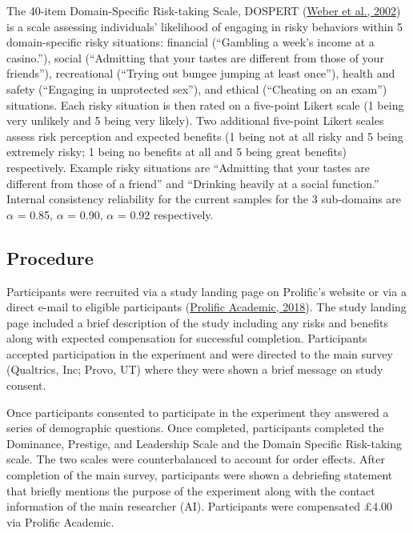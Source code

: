 \documentclass[
  donotrepeattitle,doc, 12pt, a4paper,floatsintext]{apa7}
\begin{document}
The 40-item Domain-Specific Risk-taking Scale, DOSPERT (\protect\hyperlink{ref-weber2002}{Weber et al., 2002}) is a scale assessing individuals' likelihood of engaging in risky behaviors within 5 domain-specific risky situations: financial (``Gambling a week's income at a casino.''), social (``Admitting that your tastes are different from those of your friends''), recreational (``Trying out bungee jumping at least once''), health and safety (``Engaging in unprotected sex''), and ethical (``Cheating on an exam'') situations. Each risky situation is then rated on a five-point Likert scale (1 being very unlikely and 5 being very likely). Two additional five-point Likert scales assess risk perception and expected benefits (1 being not at all risky and 5 being extremely risky; 1 being no benefits at all and 5 being great benefits) respectively. Example risky situations are ``Admitting that your tastes are different from those of a friend'' and ``Drinking heavily at a social function.'' Internal consistency reliability for the current samples for the 3 sub-domains are \(\alpha\) = 0.85, \(\alpha\) = 0.90, \(\alpha\) = 0.92 respectively.

\hypertarget{procedure}{%
\subsection{Procedure}\label{procedure}}

Participants were recruited via a study landing page on Prolific's website or via a direct e-mail to eligible participants (\protect\hyperlink{ref-prolificacademic2018}{Prolific Academic, 2018}). The study landing page included a brief description of the study including any risks and benefits along with expected compensation for successful completion. Participants accepted participation in the experiment and were directed to the main survey (Qualtrics, Inc; Provo, UT) where they were shown a brief message on study consent.

Once participants consented to participate in the experiment they answered a series of demographic questions. Once completed, participants completed the Dominance, Prestige, and Leadership Scale and the Domain Specific Risk-taking scale. The two scales were counterbalanced to account for order effects. After completion of the main survey, participants were shown a debriefing statement that briefly mentions the purpose of the experiment along with the contact information of the main researcher (AI). Participants were compensated £4.00 via Prolific Academic.
\end{document}
